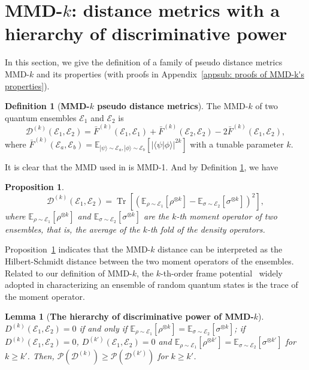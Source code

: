 \documentclass[aps,prx,reprint,superscriptaddress,amsmath,amssymb,longbibliography,floatfix]{revtex4-2}
\newcommand{\abs}[1]{\lvert #1\rvert}
\providecommand{\ket}[1]{|#1 \rangle}
\providecommand{\braket}[2]{\langle #1|#2 \rangle}
\newcommand{\dsE}{\mathbb{E}}
\newcommand{\scD}{\mathcal{D}}
\newcommand{\scE}{\mathcal{E}}
\newcommand{\scP}{\mathcal{P}}
\newcommand{\Tr}{\operatorname{Tr}}
\theoremstyle{plain}
\newtheorem{proposition}[theorem]{Proposition}
\newtheorem{lemma}[theorem]{Lemma}
\theoremstyle{definition}
\newtheorem{definition}[theorem]{Definition}
\theoremstyle{remark}
\begin{document}
\section{MMD-$k$: distance metrics with a hierarchy of discriminative power}
\label{MMDk:dis power}

In this section, we give the definition of a family of pseudo distance metrics MMD-$k$ and its properties (with proofs in Appendix~\ref{appsub: proofs of MMD-k's properties}).

\begin{definition}[\textbf{MMD-$k$ pseudo distance metrics}]
    The MMD-$k$ of two quantum ensembles $\scE_1$ and $\scE_2$ is
    \begin{equation}
    \scD^{(k)}(\scE_1,\scE_2) = \bar{F}^{(k)}(\scE_1, \scE_1)+\bar{F}^{(k)}(\scE_2, \scE_2) - 2\bar{F}^{(k)}(\scE_1, \scE_2), \label{eq: k-MMD}
\end{equation}
where $\bar{F}^{(k)}(\scE_a, \scE_b) = \dsE_{\ket{\psi}\sim\scE_a, \ket{\phi}\sim\scE_b} [\abs{\braket{\psi}{\phi}}^{2k}]$ with a tunable parameter $k$.\label{def:k-MMD}
\end{definition}
It is clear that the MMD used in \cite{QuDDPM_PhysRevLett.132.100602} is MMD-1. And by Definition \ref{def:k-MMD}, we have
\begin{proposition}
\label{prop:DK}
    \begin{equation}
        \scD^{(k)}(\scE_1,\scE_2) = \Tr[(\dsE_{\rho\sim\scE_1}[\rho^{\otimes k}]- \dsE_{\sigma\sim\scE_2}[\sigma^{\otimes k}])^2],
    \end{equation} where $\dsE_{\rho\sim\scE_1}[\rho^{\otimes k}]$ and $\dsE_{\sigma\sim\scE_2}[\sigma^{\otimes k}]$ are the $k$-th moment operator of two ensembles, that is, the average of the $k$-th fold of the density operators. 
\end{proposition}
Proposition~\ref{prop:DK} indicates that the MMD-$k$ distance can be interpreted as the Hilbert-Schmidt distance between the two moment operators of the ensembles. Related to our definition of MMD-$k$, the $k$-th-order frame potential~\cite{roberts2017chaos} widely adopted in characterizing an ensemble of random quantum states is the trace of the moment operator.
\begin{lemma}[\textbf{The hierarchy of discriminative power of MMD-$k$}]
    $D^{(k)}(\scE_1,\scE_2)=0$ if and only if $\dsE_{\rho\sim\scE_1}[\rho^{\otimes k}] = \dsE_{\sigma\sim\scE_2}[\sigma^{\otimes k}]$; if $D^{(k)}(\scE_1,\scE_2)=0$, $D^{(k')}(\scE_1,\scE_2)=0$ and $\dsE_{\rho\sim\scE_1}[\rho^{\otimes k'}] = \dsE_{\sigma\sim\scE_2}[\sigma^{\otimes k'}]$ for $k \ge k'$. Then, $\scP(\scD^{(k)})\ge\scP(\scD^{(k')})$ for $k\ge k'$. \label{thm: hierarachy of MMD-k}
\end{lemma}
\end{document}
